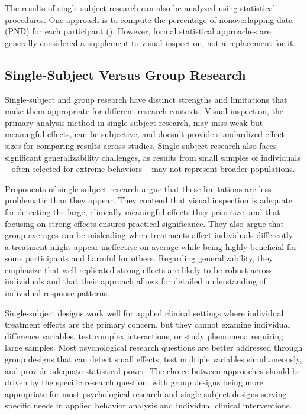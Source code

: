 \documentclass[
]{krantz}
\begin{document}
The results of single-subject research can also be analyzed using statistical procedures. One approach is to compute the \hyperref[percentage-of-nonoverlapping-data]{percentage of nonoverlapping data} (PND) for each participant (). However, formal statistical approaches are generally considered a supplement to visual inspection, not a replacement for it.

\subsection*{Single-Subject Versus Group Research}\label{single-subject-versus-group-research}


Single-subject and group research have distinct strengths and limitations that make them appropriate for different research contexts. Visual inspection, the primary analysis method in single-subject research, may miss weak but meaningful effects, can be subjective, and doesn't provide standardized effect sizes for comparing results across studies. Single-subject research also faces significant generalizability challenges, as results from small samples of individuals -- often selected for extreme behaviors -- may not represent broader populations.

Proponents of single-subject research argue that these limitations are less problematic than they appear. They contend that visual inspection is adequate for detecting the large, clinically meaningful effects they prioritize, and that focusing on strong effects ensures practical significance. They also argue that group averages can be misleading when treatments affect individuals differently -- a treatment might appear ineffective on average while being highly beneficial for some participants and harmful for others. Regarding generalizability, they emphasize that well-replicated strong effects are likely to be robust across individuals and that their approach allows for detailed understanding of individual response patterns.

Single-subject designs work well for applied clinical settings where individual treatment effects are the primary concern, but they cannot examine individual difference variables, test complex interactions, or study phenomena requiring large samples. Most psychological research questions are better addressed through group designs that can detect small effects, test multiple variables simultaneously, and provide adequate statistical power. The choice between approaches should be driven by the specific research question, with group designs being more appropriate for most psychological research and single-subject designs serving specific needs in applied behavior analysis and individual clinical interventions.
\end{document}
